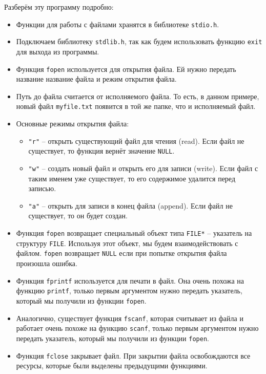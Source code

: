\documentclass[10pt]{article}
\begin{document}
Разберём эту программу подробно:

\begin{itemize}
\item Функции для работы с файлами хранятся в библиотеке \texttt{stdio.h}.
\item Подключаем библиотеку \texttt{stdlib.h}, так как будем использовать функцию \texttt{exit} для выхода из программы.
\item Функция \texttt{fopen} используется для открытия файла. Ей нужно передать название название файла и режим открытия файла.
\item Путь до файла считается от исполняемого файла. То есть, в данном примере, новый файл \texttt{myfile.txt} появится в той же папке, что и исполняемый файл.
\item Основные режимы открытия файла: 
\begin{itemize}
\item  \texttt{"r"} -- открыть существующий файл для чтения (read). Если файл не существует, то функция вернёт значение \texttt{NULL}.
\item \texttt{"w"} -- создать новый файл и открыть его для записи (write). Если файл с таким именем уже существует, то его содержимое удалится перед записью.
\item \texttt{"a"} -- открыть для записи в конец файла (append). Если файл не существует, то он будет создан.
\end{itemize}

\item Функция \texttt{fopen} возвращает специальный объект типа \texttt{FILE*} -- указатель на структуру \texttt{FILE}. Используя этот объект, мы будем взаимодействовать с файлом. \texttt{fopen} возвращает \texttt{NULL} если при попытке открытия файла произошла ошибка.

\item Функция \texttt{fprintf} используется для печати в файл. Она очень похожа на функцию \texttt{printf}, только первым аргументом нужно передать указатель, который мы получили из функции \texttt{fopen}.

\item Аналогично, существует функция \texttt{fscanf}, которая считывает из файла и работает очень похоже на функцию \texttt{scanf}, только первым аргументом нужно передать указатель, который мы получили из функции \texttt{fopen}.

\item Функция \texttt{fclose} закрывает файл. При закрытии файла освобождаются все ресурсы, которые были выделены предыдущими функциями.
\end{itemize}
\end{document}
